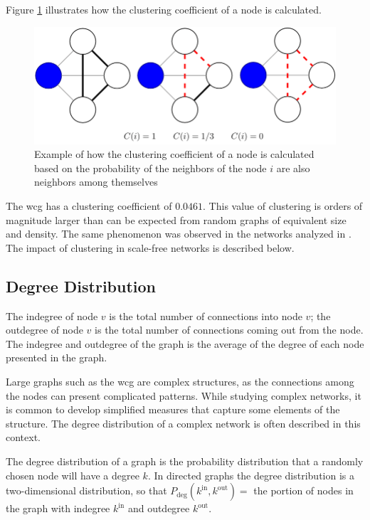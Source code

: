 Figure \ref{fig:clustering-example} illustrates how the clustering coefficient of a node is calculated.

\begin{figure}[H]
  \includegraphics[width=\linewidth]{imgs/clustering}
  \caption{Example of how the clustering coefficient of a node is calculated based on the probability of the neighbors of the node $i$ are also neighbors among themselves}
  \label{fig:clustering-example}
\end{figure}

The \gls{wcg} has a clustering coefficient of $0.0461$.  This value of clustering is orders of magnitude larger than can be expected from random graphs of equivalent size and density. The same phenomenon was observed in the networks analyzed in \cite{steyvers2005large}. The impact of clustering in scale-free networks is described below.



\subsection{\hspace*{3pt} Degree Distribution}


The indegree of node $v$ is the total number of connections into node $v$; the outdegree of node $v$ is the total number of connections coming out from the node. The indegree and outdegree of the graph is the average of the degree of each node presented in the graph.

Large graphs such as the \gls{wcg} are complex structures, as the connections among the nodes can present complicated patterns. 
While studying complex networks, it is common to develop simplified measures that capture some elements of the structure. The degree distribution of a complex network is often described in this context. 

The degree distribution of a graph is the probability distribution that a randomly chosen node will have a degree $k$. In directed graphs the degree distribution is a two-dimensional distribution, so that $P_{\text{deg}}(k^{\text{in}},k^{\text{out}} ) =$ the portion of nodes in the graph with indegree $k^{\text{in}}$ and outdegree $k^{\text{out}}$.


